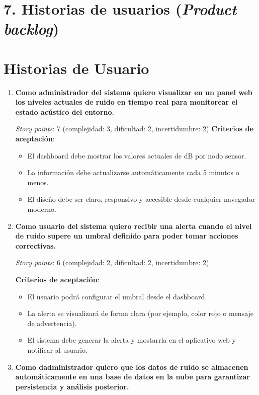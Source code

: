 \documentclass[
11pt, %
]{charter}
\begin{document}
\section{7. Historias de usuarios (\textit{Product backlog})}
\label{sec:backlog}

\section{Historias de Usuario}

\begin{enumerate}
    \item \textbf{Como administrador del sistema quiero visualizar en un panel web los niveles actuales de ruido en tiempo real para monitorear el estado acústico del entorno.}

    \textit{Story points}: 7 (complejidad: 3, dificultad: 2, incertidumbre: 2)
    \clearpage
    \textbf{Criterios de aceptación}:
    \begin{itemize}
        \item El dashboard debe mostrar los valores actuales de dB por nodo sensor.
        \item La información debe actualizarse automáticamente cada 5 minutos o menos.
        \item El diseño debe ser claro, responsivo y accesible desde cualquier navegador moderno.
    \end{itemize}

    \item \textbf{Como usuario del sistema quiero recibir una alerta cuando el nivel de ruido supere un umbral definido para poder tomar acciones correctivas.}

    \textit{Story points}: 6 (complejidad: 2, dificultad: 2, incertidumbre: 2)

    \textbf{Criterios de aceptación}:
    \begin{itemize}
        \item El usuario podrá configurar el umbral desde el dashboard.
        \item La alerta se visualizará de forma clara (por ejemplo, color rojo o mensaje de advertencia).
        \item El sistema debe generar la alerta y mostarrla en el aplicativo web y notificar al usuario.
    \end{itemize}

    \item \textbf{Como dadministrador quiero que los datos de ruido se almacenen automáticamente en una base de datos en la nube para garantizar persistencia y análisis posterior.}


\end{enumerate}
\end{document}
